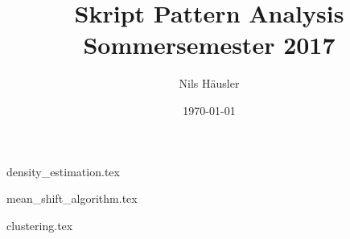 \documentclass[12p]{article}
\title{Skript Pattern Analysis Sommersemester 2017}
\author{Nils Häusler}
\date{\today}
\begin{document}
\begin{titlepage}
  \maketitle
  \thispagestyle{empty}
\end{titlepage}

\newpage
{density_estimation.tex}

\newpage
{mean_shift_algorithm.tex}

\newpage
{clustering.tex}
\end{document}
